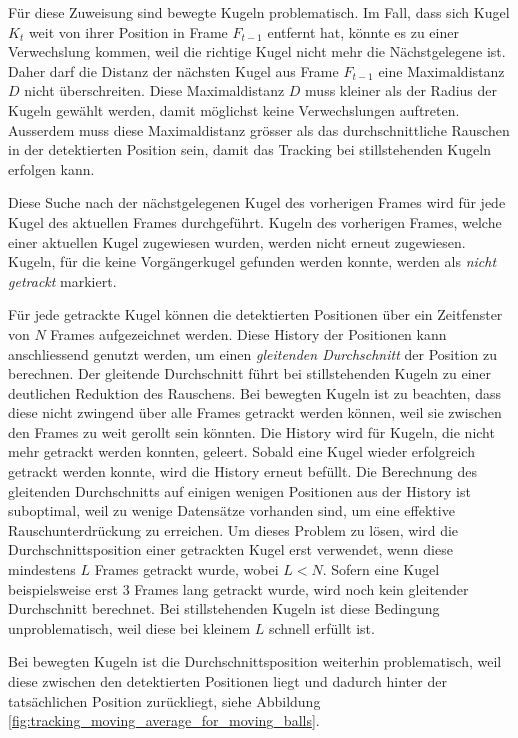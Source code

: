 Für diese Zuweisung sind bewegte Kugeln problematisch.
Im Fall, dass sich Kugel $K_{t}$ weit von ihrer Position in Frame $F_{t-1}$ entfernt hat,
könnte es zu einer Verwechslung kommen, weil die richtige Kugel nicht mehr die Nächstgelegene ist.
Daher darf die Distanz der nächsten Kugel aus Frame $F_{t-1}$ eine Maximaldistanz $D$ nicht überschreiten.
Diese Maximaldistanz $D$ muss kleiner als der Radius der Kugeln gewählt werden, damit möglichst keine Verwechslungen
auftreten. Ausserdem muss diese Maximaldistanz grösser als das durchschnittliche Rauschen in der detektierten Position
sein, damit das Tracking bei stillstehenden Kugeln erfolgen kann.

Diese Suche nach der nächstgelegenen Kugel des vorherigen Frames wird für jede Kugel des aktuellen Frames durchgeführt.
Kugeln des vorherigen Frames, welche einer aktuellen Kugel zugewiesen wurden, werden nicht erneut zugewiesen.
Kugeln, für die keine Vorgängerkugel gefunden werden konnte, werden als \emph{nicht getrackt} markiert.

Für jede getrackte Kugel können die detektierten Positionen über ein Zeitfenster von $N$ Frames aufgezeichnet werden.
Diese History der Positionen kann anschliessend genutzt werden, um einen \emph{gleitenden Durchschnitt} \cite{wiki:moving_average}
der Position zu berechnen.
Der gleitende Durchschnitt führt bei stillstehenden Kugeln zu einer deutlichen Reduktion des Rauschens.
Bei bewegten Kugeln ist zu beachten, dass diese nicht zwingend über alle Frames getrackt werden können,
weil sie zwischen den Frames zu weit gerollt sein könnten.
Die History wird für Kugeln, die nicht mehr getrackt werden konnten, geleert.
Sobald eine Kugel wieder erfolgreich getrackt werden konnte, wird die History erneut befüllt.
Die Berechnung des gleitenden Durchschnitts auf einigen wenigen Positionen aus der History ist suboptimal, weil
zu wenige Datensätze vorhanden sind, um eine effektive Rauschunterdrückung zu erreichen.
Um dieses Problem zu lösen, wird die Durchschnittsposition einer getrackten Kugel erst verwendet,
wenn diese mindestens $L$ Frames getrackt wurde, wobei $L < N$.
Sofern eine Kugel beispielsweise erst 3 Frames lang getrackt wurde, wird noch kein gleitender Durchschnitt berechnet.
Bei stillstehenden Kugeln ist diese Bedingung unproblematisch, weil diese bei kleinem $L$ schnell erfüllt ist.

Bei bewegten Kugeln ist die Durchschnittsposition weiterhin problematisch, weil diese zwischen den detektierten Positionen liegt und
dadurch hinter der tatsächlichen Position zurückliegt, siehe Abbildung \ref{fig:tracking_moving_average_for_moving_balls}.

